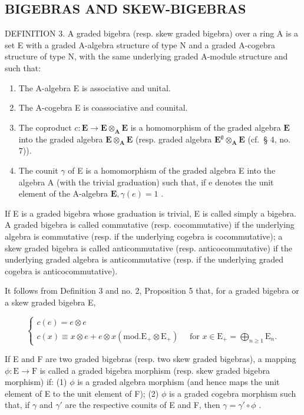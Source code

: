 \subsection{BIGEBRAS AND SKEW-BIGEBRAS}

DEFINITION 3. A graded bigebra (resp. skew graded bigebra) over a ring A is a set E with a graded A-algebra structure of type N and a graded A-cogebra structure of type N, with the same underlying graded A-module structure and such that:

\begin{enumerate}
\def\labelenumi{(\arabic{enumi})}
\item
  The A-algebra E is associative and unital.
\item
  The A-cogebra E is coassociative and counital.
\item
  The coproduct \(c: \mathbf{E} \to \mathbf{E} \otimes_{\mathbf{A}} \mathbf{E}\) is a homomorphism of the graded algebra \(\mathbf{E}\) into the graded algebra \(\mathbf{E} \otimes_{\mathbf{A}} \mathbf{E}\) (resp. graded algebra \(\mathbf{E}^{\mathfrak{g}} \otimes_{\mathbf{A}} \mathbf{E}\) (cf.~§ 4, no. 7)).
\item
  The counit \(\gamma\) of E is a homomorphism of the graded algebra E into the algebra A (with the trivial graduation) such that, if e denotes the unit element of the A-algebra \(\mathbf{E}, \gamma(e) = 1\) .
\end{enumerate}

If E is a graded bigebra whose graduation is trivial, E is called simply a bigebra. A graded bigebra is called commutative (resp. cocommutative) if the underlying algebra is commutative (resp. if the underlying cogebra is cocommutative); a skew graded bigebra is called anticommutative (resp. anticocommutative) if the underlying graded algebra is anticommutative (resp. if the underlying graded cogebra is anticocommutative).

It follows from Definition 3 and no. 2, Proposition 5 that, for a graded bigebra or a skew graded bigebra E,

\[
\left\{ \begin{array}{c} c (e) = e \otimes e \\ c (x) \equiv x \otimes e + e \otimes x (\mathrm{mod.} \mathrm{E} _ {+} \otimes \mathrm{E} _ {+}) \quad \text { for } x \in \mathrm{E} _ {+} = \bigoplus_ {n \geqslant 1} \mathrm{E} _ {n}. \end{array} \right.\tag{22}
\]

If E and F are two graded bigebras (resp. two skew graded bigebras), a mapping \(\phi: \mathrm{E} \to \mathrm{F}\) is called a graded bigebra morphism (resp. skew graded bigebra morphism) if: (1) \(\phi\) is a graded algebra morphism (and hence maps the unit element of E to the unit element of F); (2) \(\phi\) is a graded cogebra morphism such that, if \(\gamma\) and \(\gamma'\) are the respective counits of E and F, then \(\gamma = \gamma' \circ \phi\) .

